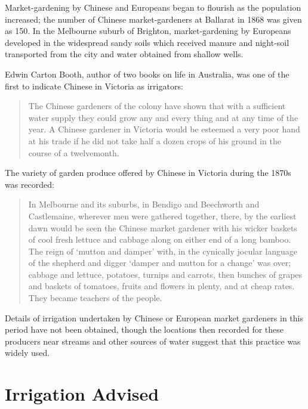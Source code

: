 Market-gardening  by Chinese and Europeans began
to flourish as the population increased; the number of Chinese
market-gardeners at Ballarat  in 1868 was given as
150.  In the Melbourne suburb of Brighton, 
market-gardening by Europeans developed in the widespread sandy soils
which received manure and night-soil transported from the city and
water obtained from shallow wells.

Edwin Carton Booth,  author of two books on life
in Australia, was one of the first to indicate Chinese in Victoria as
irrigators:
\begin{quote}
	The Chinese gardeners of the colony have shown that with a
	sufficient water supply they could grow any and every thing
	and at any time of the year. A Chinese gardener in Victoria
	would be esteemed a very poor hand at his trade if he did not
	take half a dozen crops of his ground in the course of a
	twelvemonth.
\end{quote}

The variety of garden produce offered by Chinese in Victoria during
the 1870s was record\-ed:
\begin{quote}
	In Melbourne and its suburbs, in Bendigo and Beechworth and
	Castlemaine, wherever men were gathered together, there, by
	the earliest dawn would be seen the Chinese market gardener
	with his wicker baskets of cool fresh lettuce and cabbage
	along on either end of a long bamboo.  The reign of `mutton
	and damper' with, in the cynically jocular language of the
	shepherd and digger `damper and mutton for a change' was over;
	cabbage and lettuce, potatoes, turnips and carrots, then
	bunches of grapes and baskets of tomatoes, fruits and flowers
	in plenty, and at cheap rates. They became teachers of the
	people.
\end{quote}

Details of irrigation undertaken by Chinese or European market
gardeners in this period have not been obtained, though the locations
then recorded for these producers near streams and other sources of
water suggest that this practice was widely used.

\section*{Irrigation Advised}

